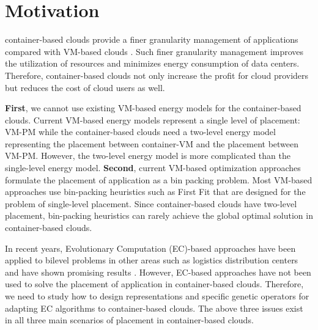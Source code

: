 \section{Motivation}
\label{sec:motivation}

 container-based clouds provide a finer granularity management of applications compared with VM-based clouds \cite{:2017ff}. Such finer granularity management improves the utilization of resources and minimizes energy consumption of data centers. Therefore, container-based clouds not only increase the profit for cloud providers but reduces the cost of cloud users as well.

 \textbf{First}, we cannot use existing VM-based energy models for the container-based clouds. Current VM-based energy models represent a single level of placement: VM-PM while the container-based clouds need a two-level energy model representing the placement between container-VM and the placement between VM-PM. However, the two-level energy model is more complicated than the single-level energy model. 
\textbf{Second}, current VM-based optimization approaches \cite{Beloglazov:2010dt, Liu:2013kl} formulate the placement of application as a bin packing problem. Most VM-based approaches use bin-packing heuristics such as First Fit \cite{Dosa:2013ie} that are designed for the problem of single-level placement. Since container-based clouds have two-level placement,  bin-packing heuristics can rarely achieve the global optimal solution in container-based clouds. 


In recent years, Evolutionary Computation (EC)-based approaches have been applied to bilevel problems in other areas such as logistics distribution centers and have shown promising results \cite{Angelo:2013ee, Sinha:2017et, Deb:2010in}. However, EC-based approaches have not been used to solve the placement of application in container-based clouds. Therefore, we need to study how to design representations and specific genetic operators for adapting EC algorithms to container-based clouds.  The above three issues exist in all three main scenarios of placement in container-based clouds. 

